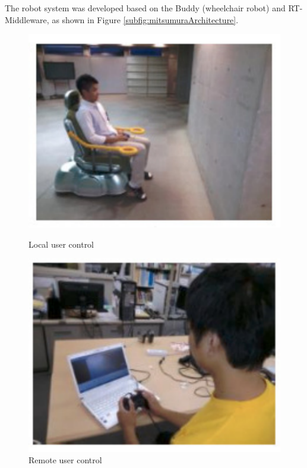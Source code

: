 The robot system was developed based on the Buddy (wheelchair robot) and RT-Middleware, as shown in Figure \ref{subfig:mitsumuraArchitecture}.

\begin{figure}[!htbp]
\center
\begin{minipage}{0.495\linewidth}
\center
\captionsetup{justification=centering,margin=0.5cm,font=small}
\includegraphics[width=0.9\linewidth]{img/cap3/mitsumuraExperimentsA}
\caption{ Local user control \cite{mitsumura2014}} \label{subfig:mitsumuraExperimentsA}
\end{minipage}
\begin{minipage}{0.495\linewidth}
\center
\captionsetup{justification=centering,margin=0cm,font=small}
\includegraphics[width=0.86\linewidth]{img/cap3/mitsumuraExperimentsB}
\caption{Remote user control \cite{mitsumura2014}} \label{subfig:mitsumuraExperimentsB}
\end{minipage}
\end{figure}


